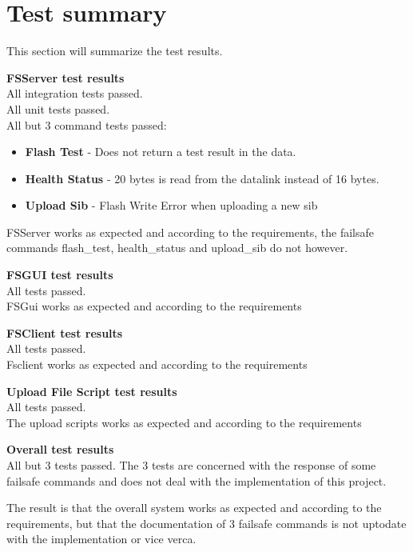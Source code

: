 \section{Test summary}
This section will summarize the test results.

\textbf{FSServer test results} \\
All integration tests passed. \\
All unit tests passed. \\
All but 3 command tests passed:
\begin{itemize}
	\item \textbf{Flash Test} - Does not return a test result in the data.
	\item \textbf{Health Status} - 20 bytes is read from the datalink instead of 16 bytes.
	\item \textbf{Upload Sib} - Flash Write Error when uploading a new sib
\end{itemize}
FSServer works as expected and according to the requirements, the failsafe commands flash\_test, health\_status and upload\_sib do not however.

\textbf{FSGUI test results} \\
All tests passed.\\
FSGui works as expected and according to the requirements

\textbf{FSClient test results} \\
All tests passed.\\
Fsclient works as expected and according to the requirements

\textbf{Upload File Script test results} \\
All tests passed.\\
The upload scripts works as expected and according to the requirements

\textbf{Overall test results} \\
All but 3 tests passed. The 3 tests are concerned with the response of some failsafe commands and does not deal with the implementation of this project.

The result is that the overall system works as expected and according to the requirements, but that the documentation of 3 failsafe commands is not uptodate with the implementation or vice verca.
